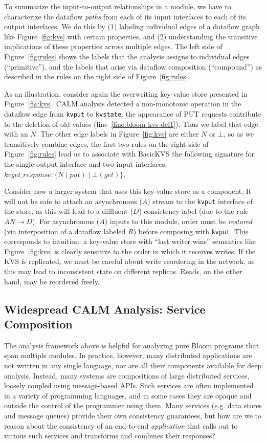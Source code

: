 To summarize the input-to-output relationships in a module, we have to characterize the dataflow \emph{paths} from each of its input interfaces to each of its output interfaces.  We do this by (1) labeling individual edges of a dataflow graph like Figure~\ref{fig:kvs} with certain properties, and (2) understanding the transitive implications of these properties across multiple edges.  The left side of Figure~\ref{fig:rules} shows the labels that the analysis assigns to individual edges (``primitive''), and the labels that arise via dataflow composition (``compound'') as described in the rules on the right side of Figure~\ref{fig:rules}.  

As an illustration, consider again the overwriting key-value store presented in Figure~\ref{fig:kvs}.
CALM analysis detected a non-monotonic operation in the dataflow edge from \texttt{kvput} to \texttt{kvstate}: the appearance of PUT requests contribute to the deletion of old values (line~\ref{line:bloom-kvs-del1}).  Thus we label that edge with an $N$.  The other edge labels in Figure~\ref{fig:kvs} are either $N$ or $\bot$, so as we transitively combine edges, the first two rules on the right side of Figure~\ref{fig:rules} lead us to associate with BasicKVS the following signature for the single output interface and two input interfaces:
$kvget\_response: \{N(put) \; | \; \bot(get)\}$.  

Consider now a larger system that uses this key-value store as a component.  It will not be safe to attach an asynchronous ($A$)
stream to the \texttt{kvput} interface of the store, as this will lead to a diffluent ($D$) consistency label
(due to the rule $AN \rightarrow D$).  For asynchronous ($A$) inputs to this module,
order must be \emph{restored} (via
interposition of a dataflow labeled $R$) 
before composing with \texttt{kvput}.  This corresponds to intuition:
a key-value store with ``last writer wins'' semantics like Figure~\ref{fig:kvs} is clearly sensitive to the order in which it receives writes.
If the KVS is replicated, we must be careful about write reordering in the network, as this
may lead to inconsistent state on different replicas.
Reads, on the other hand, may be reordered freely.

\subsection{Widespread CALM Analysis: Service Composition}
The analysis framework above is helpful for analyzing pure Bloom programs that span multiple modules.
In practice, however, many distributed applications are not written in any single language, nor are all their components available for deep analysis.  Instead, many systems are compositions of large distributed services, loosely coupled using message-based APIs.
Such services are often implemented in a variety of programming 
languages, and in some cases they are opaque and outside the control of
the programmer using them.  
Many services (e.g. data stores and message queues) provide their own 
consistency guarantees, but how are we to reason about the consistency of an end-to-end
\emph{application} that calls out to various such services and transforms
and combines their responses?  


